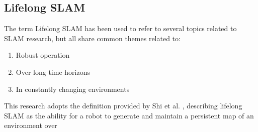 \subsection{Lifelong SLAM}

The term Lifelong SLAM has been used to refer to several topics related to SLAM research, but all share common themes related to:
\begin{singlespace}
    \begin{enumerate}
        \item Robust operation
        \item Over long time horizons
        \item In constantly changing environments
    \end{enumerate}
\end{singlespace}
This research adopts the definition provided by Shi et al. \cite{shiAreWeReady2020}, describing lifelong SLAM as the ability for a robot to generate and maintain a persistent map of an environment over 